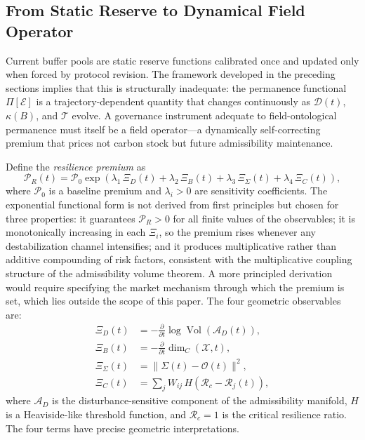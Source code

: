 \documentclass[12pt]{article}
\newcommand{\Ecal}{\mathcal{E}}
\newcommand{\Xcal}{\mathcal{X}}
\newcommand{\Acal}{\mathcal{A}}
\newcommand{\Tcal}{\mathcal{T}}
\newcommand{\vol}{\operatorname{Vol}}
\begin{document}
\subsection{From Static Reserve to Dynamical Field Operator}

Current buffer pools are static reserve functions calibrated once and updated only when
forced by protocol revision. The framework developed in the preceding sections implies
that this is structurally inadequate: the permanence functional $\Pi[\Ecal]$ is a
trajectory-dependent quantity that changes continuously as $\mathcal{D}(t)$, $\kappa(B)$,
and $\Tcal$ evolve. A governance instrument adequate to field-ontological permanence
must itself be a field operator---a dynamically self-correcting premium that prices not
carbon stock but future admissibility maintenance.

Define the \emph{resilience premium} as
\begin{equation}
\label{eq:premium}
\mathcal{P}_R(t)
= \mathcal{P}_0
\exp\!\left(
\lambda_1\,\Xi_D(t)
+ \lambda_2\,\Xi_B(t)
+ \lambda_3\,\Xi_\Sigma(t)
+ \lambda_4\,\Xi_C(t)
\right),
\end{equation}
where $\mathcal{P}_0$ is a baseline premium and $\lambda_i>0$ are sensitivity
coefficients. The exponential functional form is not derived from first principles but
chosen for three properties: it guarantees $\mathcal{P}_R>0$ for all finite values of the
observables; it is monotonically increasing in each $\Xi_i$, so the premium rises whenever
any destabilization channel intensifies; and it produces multiplicative rather than
additive compounding of risk factors, consistent with the multiplicative coupling structure
of the admissibility volume theorem. A more principled derivation would require
specifying the market mechanism through which the premium is set, which lies outside
the scope of this paper. The four geometric observables are:
\begin{align}
\Xi_D(t) &= -\frac{\partial}{\partial t}\log\vol(\Acal_D(t)),
  \label{eq:xi-d}\\
\Xi_B(t) &= -\frac{\partial}{\partial t}\dim_C(\Xcal,t),
  \label{eq:xi-b}\\
\Xi_\Sigma(t) &= \bigl\|\Sigma(t)-\mathcal{O}(t)\bigr\|^2,
  \label{eq:xi-sigma}\\
\Xi_C(t) &= \sum_j W_{ij}\,H(\mathcal{R}_c - \mathcal{R}_j(t)),
  \label{eq:xi-c}
\end{align}
where $\Acal_D$ is the disturbance-sensitive component of the admissibility manifold,
$H$ is a Heaviside-like threshold function, and $\mathcal{R}_c=1$ is the critical
resilience ratio. The four terms have precise geometric interpretations.
\end{document}

